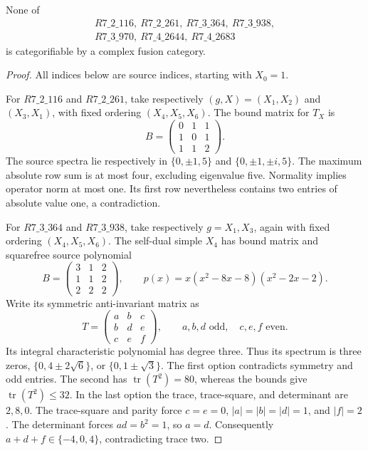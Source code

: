 \begin{theorem}
\label{thm:three-fixed}
None of
\[
 \begin{gathered}
 R7\_2\_116,\ R7\_2\_261,\ R7\_3\_364,\ R7\_3\_938,\\
 R7\_3\_970,\ R7\_4\_2644,\ R7\_4\_2683
 \end{gathered}
\]
is categorifiable by a complex fusion category.
\end{theorem}
\begin{proof}
All indices below are source indices, starting with $X_0=1$.

For $R7\_2\_116$ and $R7\_2\_261$, take respectively
$(g,X)=(X_1,X_2)$ and $(X_3,X_1)$, with fixed ordering
$(X_4,X_5,X_6)$. The bound matrix for $T_X$ is
\[
 B=\begin{pmatrix}0&1&1\\1&0&1\\1&1&2\end{pmatrix}.
\]
The source spectra lie respectively in $\{0,\pm1,5\}$ and
$\{0,\pm1,\pm i,5\}$. The maximum absolute row sum is at most four,
excluding eigenvalue five. Normality implies operator norm at most
one. Its first row nevertheless contains two entries of absolute
value one, a contradiction.

For $R7\_3\_364$ and $R7\_3\_938$, take respectively $g=X_1,X_3$,
again with fixed ordering $(X_4,X_5,X_6)$. The self-dual simple $X_4$
has bound matrix and squarefree source polynomial
\[
 B=\begin{pmatrix}3&1&2\\1&1&2\\2&2&2\end{pmatrix},\qquad
 p(x)=x(x^2-8x-8)(x^2-2x-2).
\]
Write its symmetric anti-invariant matrix as
\[
 T=\begin{pmatrix}a&b&c\\b&d&e\\c&e&f\end{pmatrix},
 \qquad a,b,d\text{ odd},\quad c,e,f\text{ even}.
\]
Its integral characteristic polynomial has degree three. Thus its
spectrum is three zeros, $\{0,4\pm2\sqrt6\}$, or
$\{0,1\pm\sqrt3\}$. The first option contradicts symmetry and odd
entries. The second has $\operatorname{tr}(T^2)=80$, whereas the
bounds give $\operatorname{tr}(T^2)\leq32$. In the last option the
trace, trace-square, and determinant are $2,8,0$. The trace-square
and parity force $c=e=0$, $|a|=|b|=|d|=1$, and $|f|=2$.
The determinant forces $ad=b^2=1$, so $a=d$. Consequently
$a+d+f\in\{-4,0,4\}$, contradicting trace two.


\end{proof}

